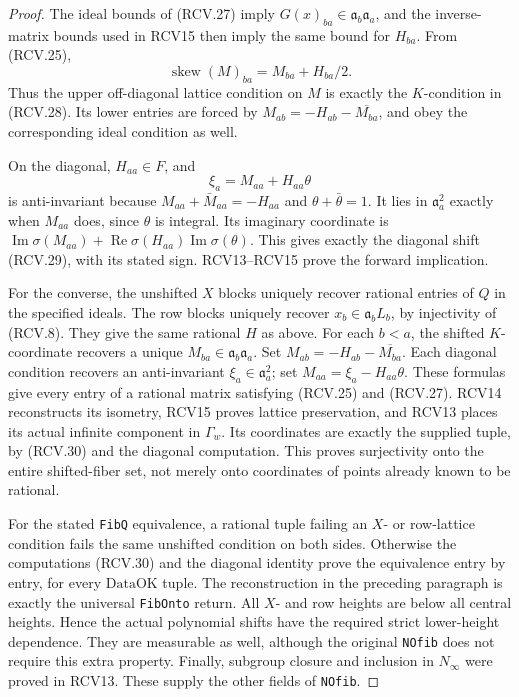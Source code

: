 \begin{proof}
The ideal bounds of (RCV.27) imply
\(G(x)_{ba}\in\mathfrak a_b\mathfrak a_a\), and the
inverse-matrix bounds used in RCV15 then imply the same bound for
\(H_{ba}\).  From (RCV.25),
\[
 \operatorname{skew}(M)_{ba}=M_{ba}+H_{ba}/2.
\tag{RCV.30}
\]
Thus the upper off-diagonal lattice condition on \(M\) is
exactly the \(K\)-condition in (RCV.28).  Its lower entries are
forced by \(M_{ab}=-H_{ab}-\overline{M_{ba}}\), and obey
the corresponding ideal condition as well.

On the diagonal, \(H_{aa}\in F\), and
\[
                  \xi_a=M_{aa}+H_{aa}\theta
\]
is anti-invariant because \(M_{aa}+\bar M_{aa}=-H_{aa}\)
and \(\theta+\bar\theta=1\).  It lies in \(\mathfrak a_a^2\)
exactly when \(M_{aa}\) does, since \(\theta\) is integral.
Its imaginary coordinate is
\(\operatorname{Im}\sigma(M_{aa})+
 \operatorname{Re}\sigma(H_{aa})\operatorname{Im}\sigma(\theta)\).
This gives exactly the diagonal shift (RCV.29), with its stated
sign.  RCV13--RCV15 prove the forward implication.

For the converse, the unshifted \(X\) blocks uniquely recover
rational entries of \(Q\) in the specified ideals.  The row
blocks uniquely recover \(x_b\in\mathfrak a_bL_b\), by
injectivity of (RCV.8).  They give the same rational \(H\) as
above.  For each \(b<a\), the shifted \(K\)-coordinate
recovers a unique \(M_{ba}\in\mathfrak a_b\mathfrak a_a\).
Set \(M_{ab}=-H_{ab}-\overline{M_{ba}}\).  Each diagonal
condition recovers an anti-invariant \(\xi_a\in\mathfrak a_a^2\);
set \(M_{aa}=\xi_a-H_{aa}\theta\).  These formulas give
every entry of a rational matrix satisfying (RCV.25) and (RCV.27).
RCV14 reconstructs its isometry, RCV15 proves lattice preservation,
and RCV13 places its actual infinite component in \(\Gamma_w\).
Its coordinates are exactly the supplied tuple, by (RCV.30) and
the diagonal computation.  This proves surjectivity onto the entire
shifted-fiber set, not merely onto coordinates of points already
known to be rational.

For the stated \texttt{FibQ} equivalence, a rational tuple failing
an \(X\)- or row-lattice condition fails the same unshifted
condition on both sides.  Otherwise the computations (RCV.30) and
the diagonal identity prove the equivalence entry by entry, for
every \(\mathrm{DataOK}\) tuple.  The reconstruction in the
preceding paragraph is exactly the universal \texttt{FibOnto}
return.  All \(X\)- and row heights are below all central heights.
Hence the actual polynomial shifts have the required strict
lower-height dependence.  They are measurable as well, although
the original \texttt{NOfib} does not require this extra property.
Finally, subgroup closure and inclusion in \(N_\infty\) were
proved in RCV13.  These supply the other fields of \texttt{NOfib}.
\end{proof}

